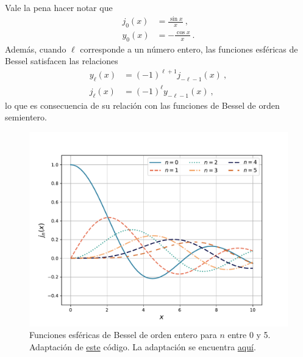 Vale la pena hacer notar que
\begin{align}
    j_0(x) & = \frac{\sin x}{x} \ , \\
    y_0(x) & = - \frac{\cos x}{x} \ .
\end{align}
Además, cuando $\ell$ corresponde a un número entero, las funciones esféricas de Bessel satisfacen las relaciones
\begin{align}
    y_{\ell}(x) & = (-1)^{\ell+1} j_{-\ell - 1}(x) \ , \\
    j_{\ell}(x) & = (-1)^{\ell  } y_{-\ell - 1}(x) \ ,
\end{align}
lo que es consecuencia de su relación con las funciones de Bessel de orden semientero.

\begin{figure}[htbp]
    \centering
    \includegraphics[width = 12cm]{Figuras/Bessel-Esferica-first-kind.pdf}
    \caption{Funciones esféricas de Bessel de orden entero para $n$ entre 0 y 5. Adaptación de \href{https://github.com/gfrubi/FM2/blob/master/figuras-editables/fig-Bessel.py}{este} código. La adaptación se encuentra \href{https://github.com/Pedroga-cc/Fisica-Matematica-II/blob/main/Figuras/Plotter_Bessel.py}{aquí}.}
    \label{fig:esferica_bessel_primera}
\end{figure}

